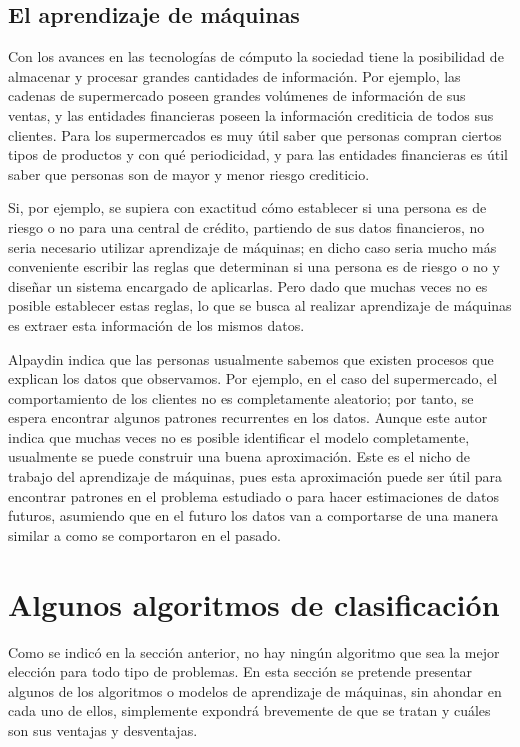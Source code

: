 \documentclass[a4paper, 11pt, oneside]{report}
\begin{document}
\subsection{El aprendizaje de máquinas}
\label{sect:machineLearning}

Con los avances en las tecnologías de cómputo la sociedad tiene la posibilidad de almacenar y procesar grandes cantidades de información. Por ejemplo, las cadenas de supermercado poseen grandes volúmenes de información de sus ventas, y las entidades financieras poseen la información crediticia de todos sus clientes. Para los supermercados es muy útil saber que personas compran ciertos tipos de productos y con qué periodicidad, y para las entidades financieras es útil saber que personas son de mayor y menor riesgo crediticio.

Si, por ejemplo, se supiera con exactitud cómo establecer si una persona es de riesgo o no para una central de crédito, partiendo de sus datos financieros, no seria necesario utilizar
aprendizaje de máquinas; en dicho caso seria mucho más conveniente escribir las reglas que determinan si una persona es de riesgo o no y diseñar un sistema encargado de aplicarlas. Pero dado que muchas veces no es posible establecer estas reglas, lo que se busca al realizar aprendizaje de máquinas es extraer esta información de los mismos datos.

Alpaydin indica que las personas usualmente sabemos que existen procesos que explican los datos que observamos. Por ejemplo, en el caso del supermercado, el comportamiento de los clientes no es completamente aleatorio; por tanto, se espera encontrar algunos patrones recurrentes en los datos. Aunque este autor indica que muchas veces no es posible identificar el modelo completamente, usualmente se puede construir una buena aproximación. Este es el nicho de trabajo del aprendizaje de máquinas, pues esta aproximación puede ser útil para encontrar patrones en el problema estudiado o para hacer estimaciones de datos futuros, asumiendo que en el futuro los datos van a comportarse de una manera similar a como se comportaron en el pasado.

\section{Algunos algoritmos de clasificación}

Como se indicó en la sección anterior, no hay ningún algoritmo que sea la mejor elección para todo tipo de problemas. En esta sección se pretende presentar algunos de los algoritmos o modelos de aprendizaje de máquinas, sin ahondar en cada uno de ellos, simplemente expondrá brevemente de que se tratan y cuáles son sus ventajas y desventajas.
\end{document}
